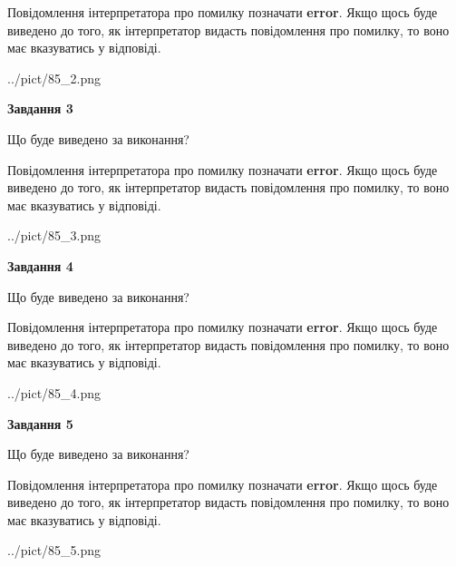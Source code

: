 \documentclass[12pt, ukrainian]{article}
\begin{document}
{\begin {large}
Повідомлення інтерпретатора про помилку позначати \textbf{error}.
Якщо щось буде виведено до того, як інтерпретатор видасть повідомлення про помилку, 
то воно має вказуватись у відповіді. \par


\begin{center}
	{../pict/85_2.png}
\end{center}
\newpage

{\begin {center}\textbf{Завдання 3}\end {center}}\par
Що буде виведено за виконання?

Повідомлення інтерпретатора про помилку позначати \textbf{error}.
Якщо щось буде виведено до того, як інтерпретатор видасть повідомлення про помилку, 
то воно має вказуватись у відповіді. \par


\begin{center}
	{../pict/85_3.png}
\end{center}
\newpage

{\begin {center}\textbf{Завдання 4}\end {center}}\par
Що буде виведено за виконання?

Повідомлення інтерпретатора про помилку позначати \textbf{error}.
Якщо щось буде виведено до того, як інтерпретатор видасть повідомлення про помилку, 
то воно має вказуватись у відповіді. \par


\begin{center}
	{../pict/85_4.png}
\end{center}
\newpage

{\begin {center}\textbf{Завдання 5}\end {center}}\par
Що буде виведено за виконання?

Повідомлення інтерпретатора про помилку позначати \textbf{error}.
Якщо щось буде виведено до того, як інтерпретатор видасть повідомлення про помилку, 
то воно має вказуватись у відповіді. \par


\begin{center}
	{../pict/85_5.png}
\end{center}
\newpage


\end{large}}
\end{document}
